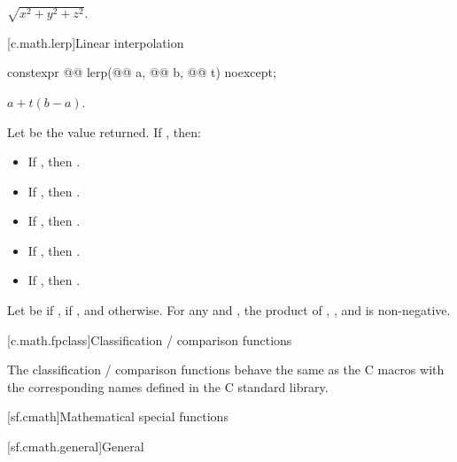 \begin{itemdescr}
\pnum
\returns
$\sqrt{x^2+y^2+z^2}$.
\end{itemdescr}

[c.math.lerp]{Linear interpolation}

%
\begin{itemdecl}
constexpr @@ lerp(@@ a, @@ b,
                                   @@ t) noexcept;
\end{itemdecl}
\begin{itemdescr}
\pnum
\returns
$a+t(b-a)$.

\pnum
\remarks
Let  be the value returned.
If , then:
\begin{itemize}
\item If , then .
\item If , then .
\item If , then .
\item If , then .
\item If , then .
\end{itemize}
Let  be  if ,
 if , and  otherwise.
For any  and , the product of
,
, and
is non-negative.
\end{itemdescr}

[c.math.fpclass]{Classification / comparison functions}

\pnum
The classification / comparison functions behave the same as the C macros with the
corresponding names defined in the C standard library.


[sf.cmath]{Mathematical special functions}%

[sf.cmath.general]{General}%
%

